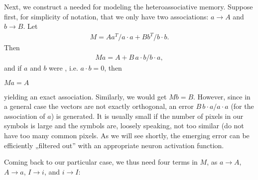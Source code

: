 \documentclass[a4paper,12pt,polish]{jupyterBook}
\begin{document}
\sphinxAtStartPar
Next, we construct a  needed for modeling the heteroassociative memory. Suppose first, for simplicity of notation, that we only have two associations: \(a \to A\) and \(b \to B\).
Let
\begin{equation*}
\begin{split}M = A a^T/a\cdot a + B b^T/b\cdot b.\end{split}
\end{equation*}
\sphinxAtStartPar
Then
\begin{equation*}
\begin{split}M a=  A + B \, a\cdot b /b \cdot a, \end{split}
\end{equation*}
\sphinxAtStartPar
and if \(a\) and \(b\) were , i.e. \(a \cdot b =0\), then

\sphinxAtStartPar
\( M a =  A\)

\sphinxAtStartPar
yielding an exact association. Similarly, we would get \(M b = B\). However, since in a general case the vectors are not exactly orthogonal, an error \(B \, b \cdot a/a \cdot a\) (for the association of \(a\)) is generated. It is usually small if the number of pixels in our symbols is large and the symbols are, loosely speaking, not too similar (do not have too many common pixels. As we will see shortly, the emerging error can be efficiently „filtered out” with an appropriate neuron activation function.

\sphinxAtStartPar
Coming back to our particular case, we thus need four terms in \(M\), as
\(a \to A\), \(A\to a\), \(I \to i\), and \(i \to I\):
\begin{sphinxVerbatimInput}

\begin{sphinxVerbatim}[commandchars=\\\{\}]
    
\end{sphinxVerbatim}
\end{sphinxVerbatimInput}
\end{document}
